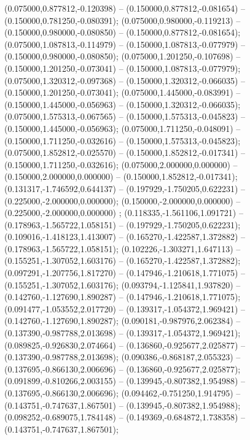  (0.075000,0.877812,-0.120398) -- (0.150000,0.877812,-0.081654) -- (0.150000,0.781250,-0.080391);
 (0.075000,0.980000,-0.119213) -- (0.150000,0.980000,-0.080850) -- (0.150000,0.877812,-0.081654);
 (0.075000,1.087813,-0.114979) -- (0.150000,1.087813,-0.077979) -- (0.150000,0.980000,-0.080850);
 (0.075000,1.201250,-0.107698) -- (0.150000,1.201250,-0.073041) -- (0.150000,1.087813,-0.077979);
 (0.075000,1.320312,-0.097368) -- (0.150000,1.320312,-0.066035) -- (0.150000,1.201250,-0.073041);
 (0.075000,1.445000,-0.083991) -- (0.150000,1.445000,-0.056963) -- (0.150000,1.320312,-0.066035);
 (0.075000,1.575313,-0.067565) -- (0.150000,1.575313,-0.045823) -- (0.150000,1.445000,-0.056963);
 (0.075000,1.711250,-0.048091) -- (0.150000,1.711250,-0.032616) -- (0.150000,1.575313,-0.045823);
 (0.075000,1.852812,-0.025570) -- (0.150000,1.852812,-0.017341) -- (0.150000,1.711250,-0.032616);
 (0.075000,2.000000,0.000000) -- (0.150000,2.000000,0.000000) -- (0.150000,1.852812,-0.017341);
 (0.131317,-1.746592,0.644137) -- (0.197929,-1.750205,0.622231) -- (0.225000,-2.000000,0.000000);
 (0.150000,-2.000000,0.000000) -- (0.225000,-2.000000,0.000000) ;
 (0.118335,-1.561106,1.091721) -- (0.178963,-1.565722,1.058151) -- (0.197929,-1.750205,0.622231);
 (0.109016,-1.418123,1.413007) -- (0.165270,-1.422587,1.372882) -- (0.178963,-1.565722,1.058151);
 (0.102226,-1.303271,1.647113) -- (0.155251,-1.307052,1.603176) -- (0.165270,-1.422587,1.372882);
 (0.097291,-1.207756,1.817270) -- (0.147946,-1.210618,1.771075) -- (0.155251,-1.307052,1.603176);
 (0.093794,-1.125841,1.937820) -- (0.142760,-1.127690,1.890287) -- (0.147946,-1.210618,1.771075);
 (0.091477,-1.053552,2.017720) -- (0.139317,-1.054372,1.969421) -- (0.142760,-1.127690,1.890287);
 (0.090181,-0.987976,2.062384) -- (0.137390,-0.987788,2.013698) -- (0.139317,-1.054372,1.969421);
 (0.089825,-0.926830,2.074664) -- (0.136860,-0.925677,2.025877) -- (0.137390,-0.987788,2.013698);
 (0.090386,-0.868187,2.055323) -- (0.137695,-0.866130,2.006696) -- (0.136860,-0.925677,2.025877);
 (0.091899,-0.810266,2.003155) -- (0.139945,-0.807382,1.954988) -- (0.137695,-0.866130,2.006696);
 (0.094462,-0.751250,1.914795) -- (0.143751,-0.747637,1.867501) -- (0.139945,-0.807382,1.954988);
 (0.098252,-0.689075,1.784148) -- (0.149369,-0.684872,1.738358) -- (0.143751,-0.747637,1.867501);
